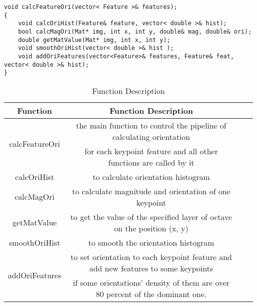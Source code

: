 \documentclass[paper=a4, fontsize=11pt]{scrartcl} %
\numberwithin{equation}{section} %
\numberwithin{figure}{section} %
\numberwithin{table}{section} %
\begin{document}
\begin{lstlisting}
void calcFeatureOri(vector< Feature >& features);
{
    void calcOriHist(Feature& feature, vector< double >& hist);
    bool calcMagOri(Mat* img, int x, int y, double& mag, double& ori);
    double getMatValue(Mat* img, int x, int y);
    void smoothOriHist(vector< double >& hist );
    void addOriFeatures(vector<Feature>& features, Feature& feat, vector< double >& hist);
}
\end{lstlisting}

\begin{table}[h]
    \centering
    \begin{tabular}{|c|c| lp{}}
        \hline
        \textbf{Function} & \textbf{Function Description} \\\hline
\multirow{2}{*}{calcFeatureOri} & the main function to control the pipeline of calculating orientation \\& for each keypoint feature and all other functions are called by it\\\hline
calcOriHist & to calculate orientation histogram\\\hline
calcMagOri & to calculate magnitude and orientation of one keypoint\\\hline
getMatValue & to get the value of the specified layer of octave on the position (x, y)\\\hline
smoothOriHist & to smooth the orientation histogram\\\hline
\multirow{2}{*}{addOriFeatures} & to set orientation to each keypoint feature and add new features to some keypoints  \\& if some orientations' density of them are over 80 percent of the dominant one.\\\hline
    \end{tabular}
    \caption{Function Description}\label{nolock}
\end{table}
\end{document}
